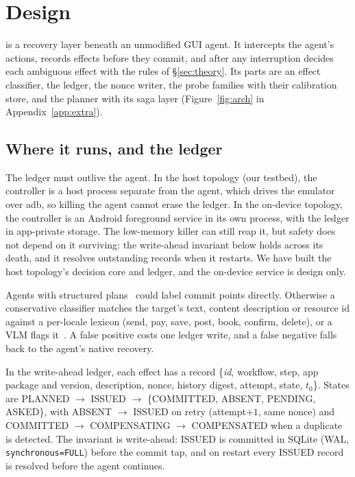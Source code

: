 \section{\sys Design}
\label{sec:design}

\sys is a recovery layer beneath an unmodified GUI agent. It intercepts the agent's actions, records effects before they commit, and after any interruption
decides each ambiguous effect with the rules of \S\ref{sec:theory}. Its parts are an effect classifier, the ledger, the nonce writer, the probe families with their
calibration store, and the \alg planner with its saga layer (Figure~\ref{fig:arch} in Appendix~\ref{app:extra}).

\subsection{Where it runs, and the ledger}
\label{sec:design-ledger}
The ledger must outlive the agent. In the host topology (our testbed), the controller is a host process separate from the agent, which drives the
emulator over adb, so killing the agent cannot erase the ledger. In the on-device topology, the controller is an Android foreground service in its own process, with the ledger
in app-private storage. The low-memory killer can still reap it, but safety does not depend on it surviving: the write-ahead invariant below holds across its death, and it resolves
outstanding records when it restarts. We have built the host topology's decision core and ledger, and the on-device service is design only.

Agents with structured plans~\cite{tian2025agentprog} could label commit points directly. Otherwise a conservative classifier matches the target's text, content
description or resource id against a per-locale lexicon (send, pay, save, post, book, confirm, delete), or a VLM flags it~\cite{lee2025verisafe,sun2025ossentinel}. A false
positive costs one ledger write, and a false negative falls back to the agent's native recovery.

In the write-ahead ledger, each effect has a record \{\textit{id}, workflow, step, app package and version, description, nonce, history digest, attempt, state, $t_0$\}. States are
\textsf{PLANNED} $\to$ \textsf{ISSUED} $\to$ \{\textsf{COMMITTED}, \textsf{ABSENT}, \textsf{PENDING}, \textsf{ASKED}\}, with \textsf{ABSENT} $\to$ \textsf{ISSUED} on retry
(attempt$+1$, same nonce) and \textsf{COMMITTED} $\to$ \textsf{COMPENSATING} $\to$ \textsf{COMPENSATED} when a duplicate is detected. The invariant is write-ahead:
\textsf{ISSUED} is committed in SQLite (WAL, \texttt{synchronous=FULL}) before the commit tap, and on restart every \textsf{ISSUED} record is resolved before the agent continues.


